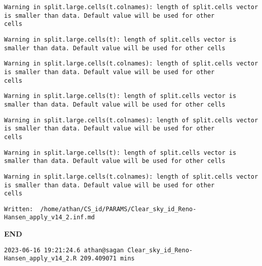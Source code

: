 \documentclass[
  10pt,
  a4paper,oneside]{article}
\begin{document}
\begin{verbatim}
Warning in split.large.cells(t.colnames): length of split.cells vector is smaller than data. Default value will be used for other
cells
\end{verbatim}

\begin{verbatim}
Warning in split.large.cells(t): length of split.cells vector is smaller than data. Default value will be used for other cells
\end{verbatim}

\begin{verbatim}
Warning in split.large.cells(t.colnames): length of split.cells vector is smaller than data. Default value will be used for other
cells
\end{verbatim}

\begin{verbatim}
Warning in split.large.cells(t): length of split.cells vector is smaller than data. Default value will be used for other cells
\end{verbatim}

\begin{verbatim}
Warning in split.large.cells(t.colnames): length of split.cells vector is smaller than data. Default value will be used for other
cells
\end{verbatim}

\begin{verbatim}
Warning in split.large.cells(t): length of split.cells vector is smaller than data. Default value will be used for other cells
\end{verbatim}

\begin{verbatim}
Warning in split.large.cells(t.colnames): length of split.cells vector is smaller than data. Default value will be used for other
cells
\end{verbatim}

\begin{verbatim}
Written:  /home/athan/CS_id/PARAMS/Clear_sky_id_Reno-Hansen_apply_v14_2.inf.md 
\end{verbatim}

\textbf{END}

\begin{verbatim}
2023-06-16 19:21:24.6 athan@sagan Clear_sky_id_Reno-Hansen_apply_v14_2.R 209.409071 mins
\end{verbatim}
\end{document}
